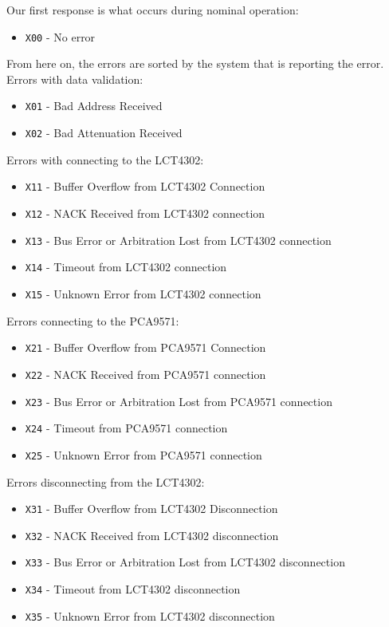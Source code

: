 Our first response is what occurs during nominal operation:
\begin{itemize}
    \item \texttt{X00} - No error
\end{itemize}
From here on, the errors are sorted by the system that is reporting the error.
Errors with data validation:
\begin{itemize}
    \item \texttt{X01} - Bad Address Received
    \item \texttt{X02} - Bad Attenuation Received
\end{itemize}
Errors with connecting to the LCT4302:
\begin{itemize}
    \item \texttt{X11} - Buffer Overflow from LCT4302 Connection
    \item \texttt{X12} - NACK Received from LCT4302 connection
    \item \texttt{X13} - Bus Error or Arbitration Lost from LCT4302 connection
    \item \texttt{X14} - Timeout from LCT4302 connection
    \item \texttt{X15} - Unknown Error from LCT4302 connection
\end{itemize}
Errors connecting to the PCA9571:
\begin{itemize}
    \item \texttt{X21} - Buffer Overflow from PCA9571 Connection
    \item \texttt{X22} - NACK Received from PCA9571 connection
    \item \texttt{X23} - Bus Error or Arbitration Lost from PCA9571 connection
    \item \texttt{X24} - Timeout from PCA9571 connection
    \item \texttt{X25} - Unknown Error from PCA9571 connection
\end{itemize}
Errors disconnecting from the LCT4302:
\begin{itemize}
    \item \texttt{X31} - Buffer Overflow from LCT4302 Disconnection
    \item \texttt{X32} - NACK Received from LCT4302 disconnection
    \item \texttt{X33} - Bus Error or Arbitration Lost from LCT4302 disconnection
    \item \texttt{X34} - Timeout from LCT4302 disconnection
    \item \texttt{X35} - Unknown Error from LCT4302 disconnection
\end{itemize}

